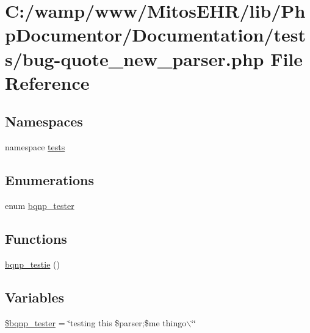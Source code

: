 \hypertarget{bug-quote__new__parser_8php}{\section{\-C\-:/wamp/www/\-Mitos\-E\-H\-R/lib/\-Php\-Documentor/\-Documentation/tests/bug-\/quote\-\_\-new\-\_\-parser.php \-File \-Reference}
\label{bug-quote__new__parser_8php}
}
\subsection*{\-Namespaces}
\begin{DoxyCompactItemize}
\item 
namespace \hyperlink{namespacetests}{tests}
\end{DoxyCompactItemize}
\subsection*{\-Enumerations}
\begin{DoxyCompactItemize}
\item 
enum \hyperlink{bug-quote__new__parser_8php_a7502f641c13f477d3983a6246d81eb6b}{bqnp\-\_\-tester} 
\end{DoxyCompactItemize}
\subsection*{\-Functions}
\begin{DoxyCompactItemize}
\item 
\hyperlink{bug-quote__new__parser_8php_a1bd7957cfdcd4d781f101a61fc90a2e5}{bqnp\-\_\-testie} ()
\end{DoxyCompactItemize}
\subsection*{\-Variables}
\begin{DoxyCompactItemize}
\item 
\hyperlink{bug-quote__new__parser_8php_afa2df248b7dffc6762a717e2f414df7c}{\$bqnp\-\_\-tester} = \char`\"{}testing this \$parser;\$me thingo$\backslash$\char`\"{}\char`\"{}
\end{DoxyCompactItemize}


